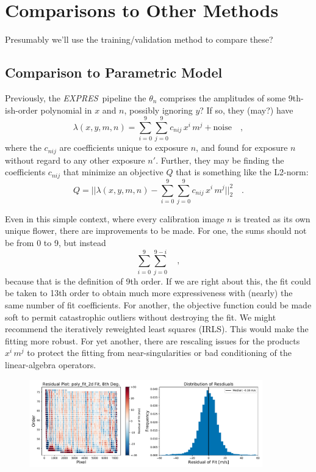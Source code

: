 \documentclass[12pt, letterpaper]{article}
\newcommand{\project}[1]{\textsl{#1}}
\newcommand{\acronym}[1]{{\small{#1}}}
\newcommand{\expres}{\project{\acronym{EXPRES}}}
\begin{document}
\section{Comparisons to Other Methods} \label{sec:comparisons}
Presumably we'll use the training/validation method to compare these?

\subsection{Comparison to Parametric Model}
Previously, the \expres\ pipeline the $\theta_{n}$ comprises the
amplitudes of some 9th-ish-order polynomial in $x$ and $n$, possibly
ignoring $y$?
If so, they (may?) have
\begin{equation}
\lambda(x,y,m,n) = \sum_{i=0}^9\sum_{j=0}^9 c_{nij}\, x^i\,m^j + \mathrm{noise}
\quad ,
\end{equation}
where the $c_{nij}$ are coefficients unique to exposure $n$, and
found for exposure $n$ without regard to any other exposure $n'$.
Further, they may be finding the coefficients $c_{nij}$ that
minimize an objective $Q$ that is something like the L2-norm:
\begin{equation}
Q = ||\lambda(x,y,m,n) - \sum_{i=0}^9\sum_{j=0}^9 c_{nij}\, x^i\,m^j||_2^2
\quad .
\end{equation}

Even in this simple context, where every calibration image $n$ is
treated as its own unique flower, there are improvements to be
made.
For one, the sums should not be from 0 to 9, but instead
\begin{equation}
\sum_{i=0}^9\sum_{j=0}^{9-i}
\quad ,
\end{equation}
because that is the definition of 9th order.
If we are right about this, the fit could be taken to 13th order to obtain
much more expressiveness with (nearly) the same number of fit coefficients.
For another, the objective function could be made soft to permit
catastrophic outliers without destroying the fit.
We might recommend the iteratively reweighted least squares (IRLS).
This would make the fitting more robust.
For yet another, there are rescaling issues for the products $x^i\,m^j$ to
protect the fitting from near-singularities or bad conditioning of the
linear-algebra operators.


\begin{figure}[h]
\centering
\includegraphics[width=0.9\textwidth]{Figures/polyval2d.pdf}
\caption{}
\label{fig:polyValFit}
\end{figure} 
\end{document}
